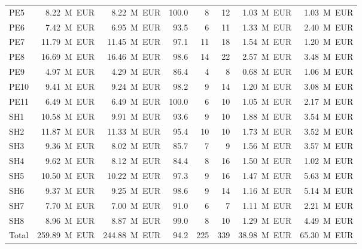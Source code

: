 \documentclass[11pt,a4paper]{article}
\begin{document}
\begin{table}[H]
\begin{tabular}{lrrrrrrr}
PE5 & 8.22~M~EUR & 8.22~M~EUR & 100.0 & 8 & 12 & 1.03~M~EUR & 1.03~M~EUR \\
PE6 & 7.42~M~EUR & 6.95~M~EUR & 93.5 & 6 & 11 & 1.33~M~EUR & 2.40~M~EUR \\
PE7 & 11.79~M~EUR & 11.45~M~EUR & 97.1 & 11 & 18 & 1.54~M~EUR & 1.20~M~EUR \\
PE8 & 16.69~M~EUR & 16.46~M~EUR & 98.6 & 14 & 22 & 2.57~M~EUR & 3.48~M~EUR \\
PE9 & 4.97~M~EUR & 4.29~M~EUR & 86.4 & 4 & 8 & 0.68~M~EUR & 1.06~M~EUR \\
PE10 & 9.41~M~EUR & 9.24~M~EUR & 98.2 & 9 & 14 & 1.20~M~EUR & 3.08~M~EUR \\
PE11 & 6.49~M~EUR & 6.49~M~EUR & 100.0 & 6 & 10 & 1.05~M~EUR & 2.17~M~EUR \\
SH1 & 10.58~M~EUR & 9.91~M~EUR & 93.6 & 9 & 10 & 1.88~M~EUR & 3.54~M~EUR \\
SH2 & 11.87~M~EUR & 11.33~M~EUR & 95.4 & 10 & 10 & 1.73~M~EUR & 3.52~M~EUR \\
SH3 & 9.36~M~EUR & 8.02~M~EUR & 85.7 & 7 & 9 & 1.56~M~EUR & 3.57~M~EUR \\
SH4 & 9.62~M~EUR & 8.12~M~EUR & 84.4 & 8 & 16 & 1.50~M~EUR & 1.02~M~EUR \\
SH5 & 10.50~M~EUR & 10.22~M~EUR & 97.3 & 9 & 16 & 1.47~M~EUR & 5.63~M~EUR \\
SH6 & 9.37~M~EUR & 9.25~M~EUR & 98.6 & 9 & 14 & 1.16~M~EUR & 5.14~M~EUR \\
SH7 & 7.70~M~EUR & 7.00~M~EUR & 91.0 & 6 & 7 & 1.11~M~EUR & 2.21~M~EUR \\
SH8 & 8.96~M~EUR & 8.87~M~EUR & 99.0 & 8 & 10 & 1.29~M~EUR & 4.49~M~EUR \\
\midrule
Total & 259.89~M~EUR & 244.88~M~EUR & 94.2 & 225 & 339 & 38.98~M~EUR & 65.30~M~EUR \\
\bottomrule
\end{tabular}
\end{table}
\end{document}
